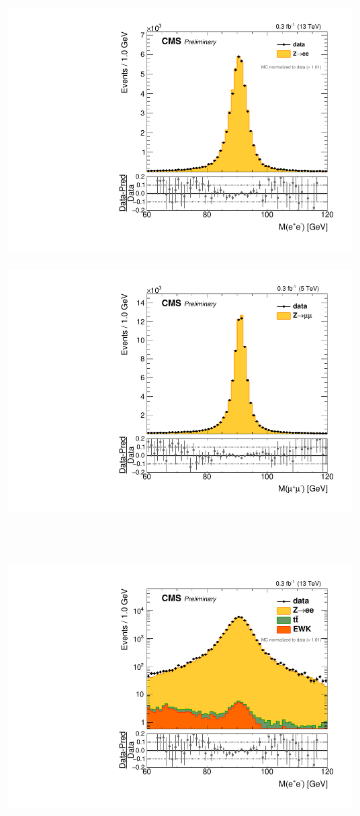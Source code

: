 \begin{figure}
\centering
\begin{subfigure}{.50\textwidth}
\centering
\includegraphics[width=\linewidth]{plots/Z/5tev/zee_norm.pdf}
\end{subfigure}%
\centering
\begin{subfigure}{.50\textwidth}
\centering
\includegraphics[width=\linewidth]{plots/Z/5tev/zmm.pdf}
\end{subfigure}%
\\
\centering
\begin{subfigure}{.50\textwidth}
\centering
\includegraphics[width=\linewidth]{plots/Z/5tev/zeelog_norm.pdf}

\end{subfigure}
\end{figure}
